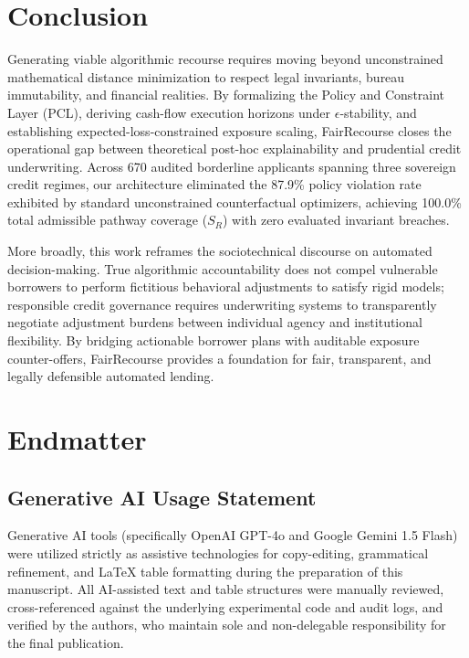 \documentclass[manuscript,screen,review,anonymous]{acmart}
\begin{document}
\section{Conclusion}
Generating viable algorithmic recourse requires moving beyond unconstrained mathematical distance minimization to respect legal invariants, bureau immutability, and financial realities. By formalizing the Policy and Constraint Layer (PCL), deriving cash-flow execution horizons under $\epsilon$-stability, and establishing expected-loss-constrained exposure scaling, FairRecourse closes the operational gap between theoretical post-hoc explainability and prudential credit underwriting. Across 670 audited borderline applicants spanning three sovereign credit regimes, our architecture eliminated the 87.9\% policy violation rate exhibited by standard unconstrained counterfactual optimizers, achieving 100.0\% total admissible pathway coverage ($S_R$) with zero evaluated invariant breaches.

More broadly, this work reframes the sociotechnical discourse on automated decision-making. True algorithmic accountability does not compel vulnerable borrowers to perform fictitious behavioral adjustments to satisfy rigid models; responsible credit governance requires underwriting systems to transparently negotiate adjustment burdens between individual agency and institutional flexibility. By bridging actionable borrower plans with auditable exposure counter-offers, FairRecourse provides a foundation for fair, transparent, and legally defensible automated lending.

\clearpage




\clearpage
\section*{Endmatter}

\subsection*{Generative AI Usage Statement}
Generative AI tools (specifically OpenAI GPT-4o and Google Gemini 1.5 Flash) were utilized strictly as assistive technologies for copy-editing, grammatical refinement, and \LaTeX{} table formatting during the preparation of this manuscript. All AI-assisted text and table structures were manually reviewed, cross-referenced against the underlying experimental code and audit logs, and verified by the authors, who maintain sole and non-delegable responsibility for the final publication.
\end{document}
